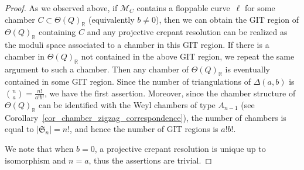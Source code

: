 \documentclass[10pt,a4paper]{amsart}
\numberwithin{equation}{section}
\theoremstyle{definition}
\newcommand{\RR}{\mathbb{R}}
\newcommand{\calM}{\mathcal{M}}
\newcommand{\fkS}{\mathfrak{S}}
\begin{document}
\begin{proof}
As we observed above, if $\calM_C$ contains a floppable curve~$\ell$ for some chamber $C\subset \Theta(Q)_\RR$ (equivalently $b\neq 0$),
then we can obtain the GIT region of $\Theta(Q)_\RR$ containing $C$ and any projective crepant resolution can be realized as the moduli space
associated to a chamber in this GIT region.
If there is a chamber in $\Theta(Q)_\RR$ not contained in the above GIT region, we repeat the same argument to such a chamber.
Then any chamber of $\Theta(Q)_\RR$ is eventually contained in some GIT region.
Since the number of triangulations of $\Delta(a,b)$ is ${n \choose a}=\frac{n!}{a! b!}$, we have the first assertion.
Moreover, since the chamber structure of $\Theta(Q)_\RR$ can be identified with the Weyl chambers of type $A_{n-1}$ (see Corollary~\ref{cor_chamber_zigzag_correspondence}),
the number of chambers is equal to $|\fkS_n|=n!$, and hence the number of GIT regions is $a! b!$.

We note that when $b=0$, a projective crepant resolution is unique up to isomorphism and $n=a$, thus the assertions are trivial.
\end{proof}
\end{document}
